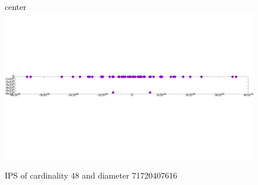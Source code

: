 \documentclass[12pt]{article}
\theoremstyle{theorem}
\theoremstyle{dfn}
\theoremstyle{remark}
\begin{document}
\begin{figure}[h!]
center{\includegraphics[width=1\linewidth]{./img/48_symm.png}}
\parbox{1\linewidth}{\caption{IPS of cardinality 48 and diameter 71720407616}
\label{48_symm.png}}
\end{figure}
\end{document}
